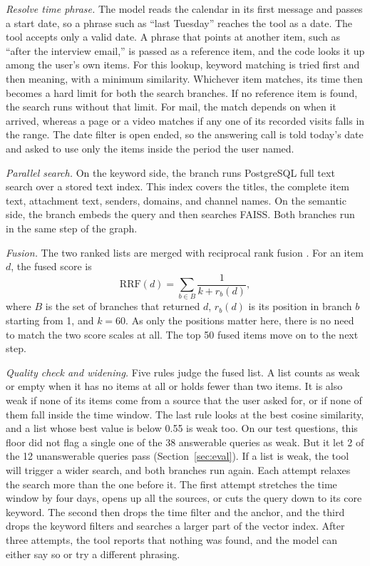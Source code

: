 \documentclass[conference]{IEEEtran}
\begin{document}
\textit{Resolve time phrase.} The model reads the calendar in its first message and passes a start date, so a phrase such as ``last Tuesday'' reaches the tool as a date. The tool accepts only a valid date. A phrase that points at another item, such as ``after the interview email,'' is passed as a reference item, and the code looks it up among the user's own items. For this lookup, keyword matching is tried first and then meaning, with a minimum similarity. Whichever item matches, its time then becomes a hard limit for both the search branches. If no reference item is found, the search runs without that limit. For mail, the match depends on when it arrived, whereas a page or a video matches if any one of its recorded visits falls in the range. The date filter is open ended, so the answering call is told today's date and asked to use only the items inside the period the user named.

\textit{Parallel search.} On the keyword side, the branch runs PostgreSQL full text search over a stored text index. This index covers the titles, the complete item text, attachment text, senders, domains, and channel names. On the semantic side, the branch embeds the query and then searches FAISS. Both branches run in the same step of the graph.

\textit{Fusion.} The two ranked lists are merged with reciprocal rank fusion \cite{b9}. For an item $d$, the fused score is
\begin{equation}
\mathrm{RRF}(d) = \sum_{b \in B} \frac{1}{k + r_b(d)}, \label{eq:rrf}
\end{equation}
where $B$ is the set of branches that returned $d$, $r_b(d)$ is its position in branch $b$ starting from 1, and $k = 60$. As only the positions matter here, there is no need to match the two score scales at all. The top 50 fused items move on to the next step.

\textit{Quality check and widening.} Five rules judge the fused list. A list counts as weak or empty when it has no items at all or holds fewer than two items. It is also weak if none of its items come from a source that the user asked for, or if none of them fall inside the time window. The last rule looks at the best cosine similarity, and a list whose best value is below 0.55 is weak too. On our test questions, this floor did not flag a single one of the 38 answerable queries as weak. But it let 2 of the 12 unanswerable queries pass (Section~\ref{sec:eval}). If a list is weak, the tool will trigger a wider search, and both branches run again. Each attempt relaxes the search more than the one before it. The first attempt stretches the time window by four days, opens up all the sources, or cuts the query down to its core keyword. The second then drops the time filter and the anchor, and the third drops the keyword filters and searches a larger part of the vector index. After three attempts, the tool reports that nothing was found, and the model can either say so or try a different phrasing.
\end{document}
